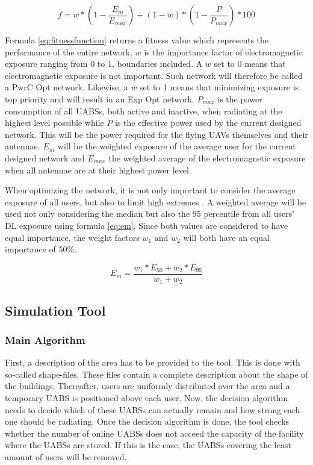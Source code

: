 \documentclass[twocolumn]{phdsymp} %
\begin{document}
\begin{equation} 
f = w * \left(1 - \frac{E_m}{E_{max}}\right) + (1 - w)*\left(1 - \frac{P}{P_{max}}\right) * 100
\label{eq:fitnessfunction}
\end{equation}

Formula \ref{eq:fitnessfunction} returns a fitness value which represents the performance of the entire network. 
$w$ is the importance factor of electromagnetic exposure ranging from 0 to 1, boundaries included. A $w$ set to 0 means that electromagnetic 
exposure is not important. Such network will therefore be called a \gls{PwrC Opt} network. 
Likewise, a $w$ set to 1 means that minimizing exposure is top priority and will result in an \gls{Exp Opt} network. $P_{max}$ is the power consumption of all UABSs, 
both active and inactive, when radiating at the highest level possible 
while $P$ is the effective power used by the current designed network. 
This will be the power required for the flying \gls{UAV}s themselves and their antennae.
$E_m$ will be the weighted exposure of the average user for the current designed network and $E_{max}$ the weighted average of the electromagnetic exposure when all antennae 
are at their highest power level.

When optimizing the network, it is not only important to consider the average exposure of all users, but also to limit high extremes \cite{J1}. A weighted average 
will be used not only considering the median but also the 95 percentile from all users' \gls{DL} exposure using formula \ref{eq:em}. 
Since both values are considered to have equal importance, the weight factors $w_1$ and $w_2$ will both have an equal importance of 50\%. 

\begin{equation} 
E_m = \frac{w_1 * E_{50} + w_2 * E_{95}}{w_1 + w_2}
\label{eq:em}
\end{equation}


\subsection{Simulation Tool}

\subsubsection{Main Algorithm}
First, a description of the area has to be provided to the tool. This is done with so-called shape-files.
These  files contain a complete description about the shape of the buildings. Thereafter, users are uniformly
distributed over the area and a temporary \gls{UABS} is positioned above each user. Now, the decision algorithm
needs to decide which of these \gls{UABS}s can actually remain and how strong each one should be radiating. Once the 
decision algorithm is done, the tool checks whether the number of online \gls{UABS}s does not acceed the capacity of 
the facility where the \gls{UABS}s are stored. If this is the case, the \gls{UABS}s covering the least amount of users 
will be removed.
\end{document}

